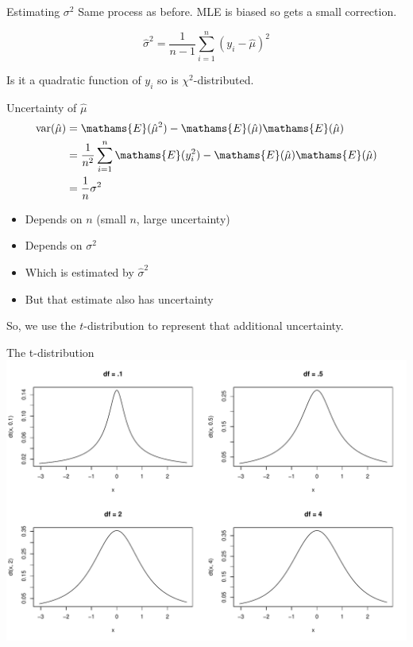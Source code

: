 \documentclass[
  ignorenonframetext,
]{beamer}
\providecommand{\tightlist}{%
  \setlength{\itemsep}{0pt}\setlength{\parskip}{0pt}}
\begin{document}
\begin{frame}{Estimating \(\sigma^2\)}
\label{estimating-sigma2}
Same process as before. MLE is biased so gets a small correction.

\begin{equation}
\hat{\sigma}^2 = \frac{1}{n-1}\sum \limits^n_{i=1}(y_i-\hat{\mu})^2
\end{equation}

Is it a quadratic function of \(y_i\) so is \(\chi^2\)-distributed.
\end{frame}

\begin{frame}{Uncertainty of \(\hat{\mu}\)}
\label{uncertainty-of-hatmu}
\begin{equation}
\begin{aligned}
\text{var}(\hat{\mu}) &= \mathams{E}(\hat{\mu}^2)-\mathams{E}(\hat{\mu})\mathams{E}(\hat{\mu})\\
&= \frac{1}{n^2}\sum\limits^n_{i=1}\mathams{E}(y_i^2)-\mathams{E}(\hat{\mu})\mathams{E}(\hat{\mu})\\
&= \frac{1}{n}\sigma^2
\end{aligned}
\end{equation}

\begin{itemize}
\tightlist
\item
  Depends on \(n\) (small \(n\), large uncertainty)
\item
  Depends on \(\sigma^2\)
\item
  Which is estimated by \(\hat{\sigma}^2\)
\item
  But that estimate also has uncertainty
\end{itemize}

So, we use the \(t\)-distribution to represent that additional
uncertainty.
\end{frame}

\begin{frame}{The t-distribution}
\label{the-t-distribution}
\includegraphics{IntroLM_files/figure-beamer/unnamed-chunk-6-1.pdf}
\end{frame}
\end{document}
